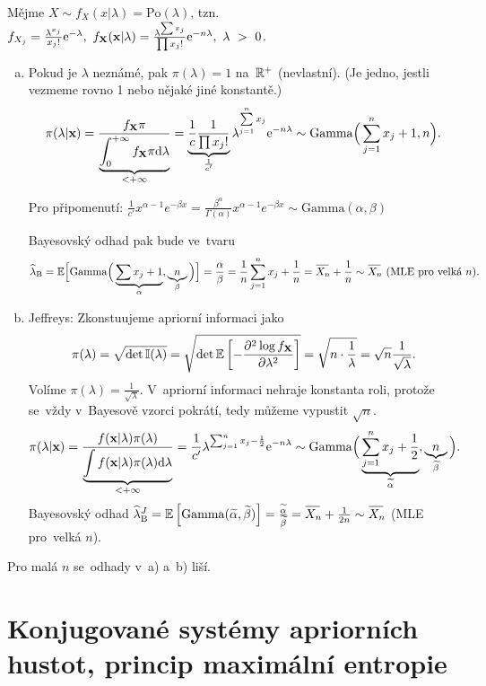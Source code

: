 \begin{example}
	Mějme $X\sim f_X(x|\lambda)=\mathrm{Po}(\lambda)$, tzn. $f_{X_j}=\frac{\lambda^{x_j}}{x_j!}\mathrm{e}^{-\lambda},~f_\textbf{X}(\textbf{x}|\lambda)=\frac{\lambda^{\sum x_j}}{\prod x_j!}\mathrm{e}^{-n\lambda},~\lambda~>~0$.\begin{enumerate}[a)]
		\item Pokud je $\lambda$ neznámé, pak $\pi(\lambda)=1$ na~$\mathbb{R}^+$ (nevlastní). (Je jedno, jestli vezmeme rovno 1 nebo nějaké jiné konstantě.)
		$$
		\pi(\lambda|\textbf{x})=\frac{f_{\textbf{X}} \pi}{\underbrace{\int_{0}^{+\infty}f_{\textbf{X}}\pi\mathrm{d}\lambda}_{<+\infty}}=\underbrace{\frac{1}{c}\frac{1}{\prod x_j!}}_{\frac{1}{c'}}\lambda^{\sum\limits_{j=1}^{n} x_j}\mathrm{e}^{-n\lambda}\sim\mathrm{Gamma}\Big(\sum\limits_{j=1}^{n} x_j+1,n\Big).$$
		
		Pro připomenutí: $\frac{1}{c'}x^{\alpha-1}e^{-\beta x}=\frac{\beta^{\alpha}}{\Gamma(\alpha)}x^{\alpha-1}e^{-\beta x } \sim \mathrm{Gamma}(\alpha,\beta) $
		
		Bayesovský odhad pak bude ve~tvaru
		$$\widehat{\lambda}_\mathrm{B}=\E\Big[\mathrm{Gamma}\Big(\underbrace{\sum x_j+1}_{\alpha},\underbrace{n}_\beta\Big)\Big]=\frac{\alpha}{\beta}=\frac{1}{n}\sumjn x_j+\frac{1}{n}=\Oxn+\frac{1}{n}\sim \Oxn~(\text{MLE pro~velká }n).$$
		\item Jeffreys: Zkonstuujeme apriorní informaci jako $$\pi(\lambda)=\sqrt{\det \mathbb{I}(\lambda)}=\sqrt{\det \mathbb{E}\left[ -\frac{\partial^2\log f_{\textbf{X}}}{\partial\lambda^2} \right]}=\sqrt{n\cdot\frac{1}{\lambda}}=\sqrt{n}\frac{1}{\sqrt{\lambda}}.$$
		Volíme $\pi(\lambda)=\frac{1}{\sqrt{\lambda}}$. V~apriorní informaci nehraje konstanta roli, protože se~vždy v~Bayesově vzorci pokrátí, tedy můžeme vypustit $\sqrt{n}$.
		$$ \pi(\lambda|\textbf{x})=\frac{f(\textbf{x}|\lambda) \pi(\lambda)}{\underbrace{\int f(\textbf{x}|\lambda)\pi(\lambda)\mathrm{d}\lambda}_{<+\infty}}=\frac{1}{c'}\lambda^{\sum_{j=1}^n x_j-\frac{1}{2}}\mathrm{e}^{-n\lambda}\sim\mathrm{Gamma}\Big(\underbrace{\sum\limits_{j=1}^{n} x_j+\frac{1}{2}}_{\widetilde{\alpha}},\underbrace{n}_{\widetilde{\beta}}\Big).$$
		Bayesovský odhad $\widehat{\lambda}_\mathrm{B}^J=\EE{\mathrm{Gamma}(\widetilde{\alpha},\widetilde{\beta})}=\frac{\widetilde{\alpha}}{\widetilde{\beta}}=\Oxn+\frac{1}{2n}\sim\Oxn$ (MLE pro~velká $n$).
	\end{enumerate}
	Pro malá $n$ se~odhady v~a) a~b) liší.
\end{example}

\chapter{Konjugované systémy apriorních hustot, princip maximální entropie}

